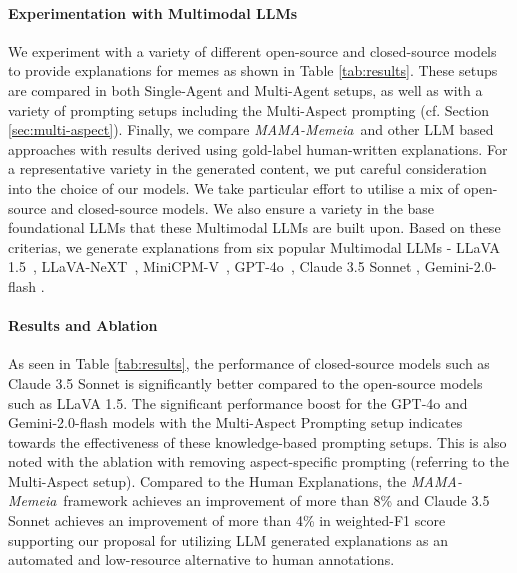 \documentclass[letterpaper]{article} %
\newcommand{\llava}{LLaVA 1.5}
\newcommand{\llavanext}{LLaVA-NeXT}
\newcommand{\mcpm}{MiniCPM-V}
\newcommand{\gpt}{GPT-4o}
\newcommand{\model}{\textit{MAMA-Memeia}}
\begin{document}
\paragraph{Experimentation with Multimodal LLMs}
We experiment with a variety of different open-source and closed-source models to provide explanations for memes as shown in Table \ref{tab:results}. These setups are compared in both Single-Agent and Multi-Agent setups, as well as with a variety of prompting setups including the Multi-Aspect prompting (cf. Section \ref{sec:multi-aspect}). Finally, we compare \model\ and other LLM based approaches with results derived using gold-label human-written explanations. For a representative variety in the generated content, we put careful consideration into the choice of our models. We take particular effort to utilise a mix of open-source and closed-source models. We also ensure a variety in the base foundational LLMs that these Multimodal LLMs are built upon.
Based on these criterias, we generate explanations from six popular Multimodal LLMs
- \llava\ \citep{liu2023llava}, \llavanext\ \citep{liu2024llavanext}, \mcpm\ \citep{hu2024minicpm}, \gpt\ \citep{openai2024gpt4ocard},  Claude 3.5 Sonnet \cite{claude}, Gemini-2.0-flash \cite{geminiteam2024geminifamilyhighlycapable}.

\paragraph{Results and Ablation}
As seen in Table \ref{tab:results}, the performance of closed-source models such as Claude 3.5 Sonnet is significantly better compared to the open-source models such as LLaVA 1.5. The significant performance boost for the GPT-4o and Gemini-2.0-flash models with the Multi-Aspect Prompting setup indicates towards the effectiveness of these knowledge-based prompting setups. This is also noted with the ablation with removing aspect-specific prompting (referring to the Multi-Aspect setup). Compared to the Human Explanations, the \model\ framework achieves an improvement of more than 8\% and Claude 3.5 Sonnet achieves an improvement of more than 4\% in weighted-F1 score supporting our proposal for utilizing LLM generated explanations as an automated and low-resource alternative to human annotations. 
\end{document}
